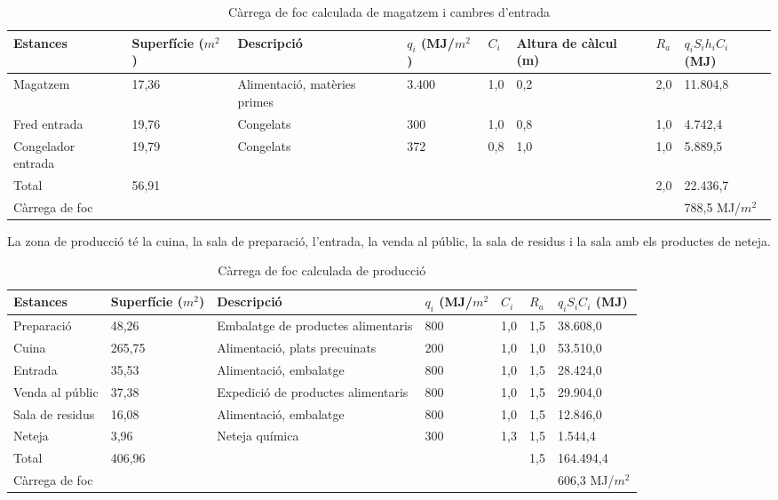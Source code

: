 \begin{table}[H]
\footnotesize
\begin{center}
 \begin{tabu} to \textwidth {|X[1.5, l]|X[r]|X[2, l]|X[1, r]|X[0.5, r]|X[r]|X[0.5, r]|X[r]|}%
 \hline
Estances & Superfície ($m^2$)& Descripció & $q_i$ (MJ/$m^2$) & $C_i$ & Altura de càlcul (m) & $R_a$ & $q_{i}S_ih_iC_i$ (MJ) \\
 \hline \hline 
Magatzem & 17,36 & Alimentació, matèries primes & 3.400 & 1,0 & 0,2 & 2,0 & 11.804,8 \\ \hline
Fred entrada & 19,76 & Congelats & 300 & 1,0 & 0,8 & 1,0 & 4.742,4 \\ \hline
Congelador entrada & 19,79 & Congelats & 372 & 0,8 & 1,0 & 1,0 & 5.889,5 \\ \hline
\hline
Total & 56,91 & & & & & 2,0 & 22.436,7 \\ \hline
Càrrega de foc &  & 788,5 MJ/$m^2$ \\ \hline
 \end{tabu}
 \caption{Càrrega de foc calculada de magatzem i cambres d'entrada}
\end{center}
\end{table}
\noindent La zona de producció té la cuina, la sala de preparació, l'entrada, la venda al públic, la sala de residus i la sala amb els productes de neteja.
%
\begin{table}[H]
\footnotesize
\begin{center}
 \begin{tabu} to \textwidth {|X[1.5, l]|X[r]|X[2, l]|X[1, r]|X[0.5, r]|X[0.5, r]|X[r]|}%
 \hline
Estances & Superfície ($m^2$)& Descripció & $q_i$ (MJ/$m^2$ & $C_i$ &  $R_a$ & $q_{i}S_iC_i$ (MJ) \\
 \hline \hline 
Preparació & 48,26 & Embalatge de productes alimentaris & 800 & 1,0  & 1,5 & 38.608,0 \\ \hline
Cuina & 265,75 & Alimentació, plats precuinats & 200 & 1,0 & 1,0 & 53.510,0 \\ \hline
Entrada & 35,53 & Alimentació, embalatge & 800 & 1,0 & 1,5 & 28.424,0 \\ \hline
Venda al públic & 37,38 & Expedició de productes alimentaris & 800 & 1,0 & 1,5 & 29.904,0 \\ \hline
Sala de residus & 16,08 & Alimentació, embalatge & 800 & 1,0 & 1,5 & 12.846,0 \\ \hline
Neteja & 3,96 & Neteja química & 300 & 1,3 & 1,5 & 1.544,4 \\ \hline
\hline
Total & 406,96 & & & & 1,5 & 164.494,4 \\ \hline
Càrrega de foc &  & 606,3 MJ/$m^2$ \\ \hline
 \end{tabu}
 \caption{Càrrega de foc calculada de producció}
\end{center}
\end{table}
